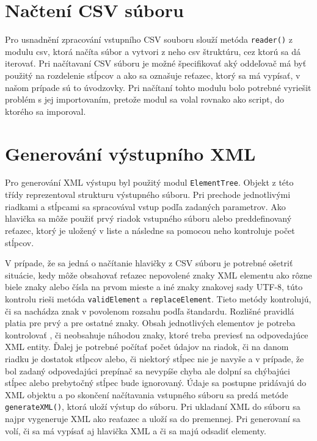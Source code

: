 \documentclass[10pt,a4paper,final]{article}
\begin{document}
  \section{Načtení CSV súboru} \label{nacitanie-suboru}
Pro usnadnění zpracování vstupního CSV souboru slouží metóda \texttt{reader()} z modulu csv, ktorá načíta súbor a vytvori z neho csv štruktúru, cez ktorú sa dá iterovať. Pri načítavaní CSV súboru je možné špecifikovať aký oddeľovač má byť použitý na rozdelenie stĺpcov a ako sa oznašuje reťazec, ktorý sa má vypísať, v našom prípade sú to úvodzovky. Pri načítaní tohto modulu bolo potrebné vyriešit problém s jej importovaním, pretože modul sa volal rovnako ako script, do ktorého sa imporoval.


  \section{Generování výstupního XML} \label{generovanie-xml}

Pro generování XML výstupu byl použitý modul \texttt{ElementTree}. Objekt z této třídy reprezentoval strukturu výstupného súboru. Pri prechode jednotlivými riadkami a stĺpcami sa spracovával vstup podľa zadaných parametrov. Ako hlavička sa môže použiť prvý riadok vstupného súboru alebo preddefinovaný reťazec, ktorý je uložený v liste a následne sa pomocou neho kontroluje počet stĺpcov. 

V prípade, že sa jedná o načítanie hlavičky z CSV súboru je potrebné ošetriť situácie, kedy môže obsahovať reťazec nepovolené znaky XML elementu ako rôzne biele znaky alebo čísla na prvom mieste a iné znaky znakovej sady UTF-8, túto kontrolu rieši metóda \texttt{validElement} a  \texttt{replaceElement}. Tieto metódy kontrolujú, či sa nachádza znak v povolenom rozsahu podľa štandardu. Rozlišné pravidlá platia pre prvý a pre ostatné znaky. Obsah jednotlivých elementov je potreba kontrolovať , či neobsahuje náhodou znaky, ktoré treba previesť na odpovedajúce XML entity. Ďalej je potrebné počítať počet údajov na riadok, či na danom riadku je dostatok stĺpcov alebo, či niektorý stĺpec nie je navyše a v prípade, že bol zadaný odpovedajúci prepínač sa nevypíše chyba ale dolpní sa chýbajúci stĺpec alebo prebytočný stĺpec bude ignorovaný. Údaje sa postupne pridávajú do XML objektu a po skončení načítavania vstupného súboru sa predá metóde \texttt{generateXML()}, ktorá uloží výstup do súboru. Pri ukladaní XML do súboru sa najpr vygeneruje XML ako reaťazec a uloží sa do premennej. Pri generovaní sa volí, či sa má vypísať aj hlavička XML a či sa majú odsadiť elementy. 
   
\end{document}
